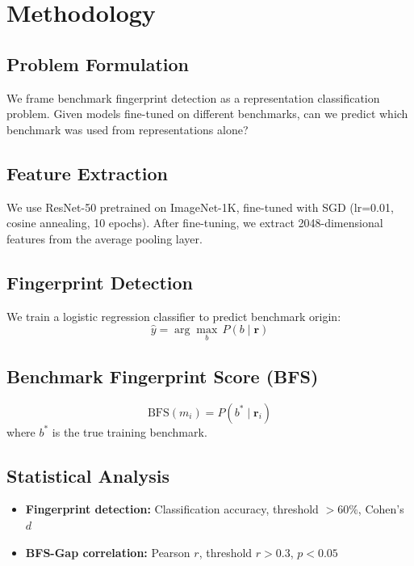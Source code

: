\section{Methodology}
\label{sec:methodology}

\subsection{Problem Formulation}

We frame benchmark fingerprint detection as a representation classification problem. Given models fine-tuned on different benchmarks, can we predict which benchmark was used from representations alone?

\subsection{Feature Extraction}

We use ResNet-50 pretrained on ImageNet-1K, fine-tuned with SGD (lr=0.01, cosine annealing, 10 epochs). After fine-tuning, we extract 2048-dimensional features from the average pooling layer.

\subsection{Fingerprint Detection}

We train a logistic regression classifier to predict benchmark origin:
\begin{equation}
\hat{y} = \arg\max_b \, P(b \mid \mathbf{r})
\end{equation}

\subsection{Benchmark Fingerprint Score (BFS)}

\begin{equation}
\text{BFS}(m_i) = P(b^* \mid \mathbf{r}_i)
\end{equation}
where $b^*$ is the true training benchmark.

\subsection{Statistical Analysis}

\begin{itemize}
    \item \textbf{Fingerprint detection:} Classification accuracy, threshold $> 60\%$, Cohen's $d$
    \item \textbf{BFS-Gap correlation:} Pearson $r$, threshold $r > 0.3$, $p < 0.05$
\end{itemize}
